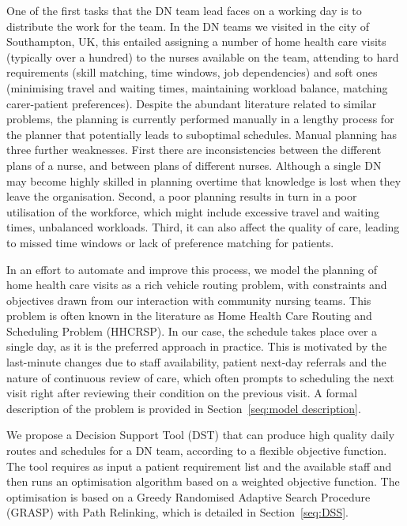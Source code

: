 \documentclass[a4paper,11pt]{elsarticle}
\begin{document}
One of the first tasks that the DN team lead faces on a working day is to distribute the work for the team. In the DN teams we visited in the city of Southampton, UK, this entailed assigning a number of home health care visits (typically over a hundred) to the nurses available on the team, attending to hard requirements (skill matching, time windows, job dependencies) and soft ones (minimising travel and waiting times, maintaining workload balance, matching carer-patient preferences). Despite the abundant literature related to similar problems, the planning is currently performed manually in a lengthy process for the planner that potentially leads to suboptimal schedules. Manual planning has three further weaknesses. First there are inconsistencies between the different plans of a nurse, and between plans of different nurses. Although a single DN may become highly skilled in planning overtime that knowledge is lost when they leave the organisation. Second, a poor planning results in turn in a poor utilisation of the workforce, which might include excessive travel and waiting times, unbalanced workloads. Third, it can also affect the quality of care, leading to missed time windows or lack of preference matching for patients.

In an effort to automate and improve this process, we model the planning of home health care visits as a rich vehicle routing problem, with constraints and objectives drawn from our interaction with community nursing teams. This problem is often known in the literature as Home Health Care Routing and Scheduling Problem (HHCRSP). In our case, the schedule takes place over a single day, as it is the preferred approach in practice. This is motivated by the last-minute changes due to staff availability, patient next-day referrals and the nature of continuous review of care, which often prompts to scheduling the next visit right after reviewing their condition on the previous visit. A formal description of the problem is provided in Section~\ref{seq:model description}.

We propose a Decision Support Tool (DST) that can produce high quality daily routes and schedules for a DN team, according to a flexible objective function. The tool requires as input a patient requirement list and the available staff and then runs an optimisation algorithm based on a weighted objective function. The optimisation is based on a Greedy Randomised Adaptive Search Procedure (GRASP) with Path Relinking, which is detailed in Section~\ref{seq:DSS}.
\end{document}
